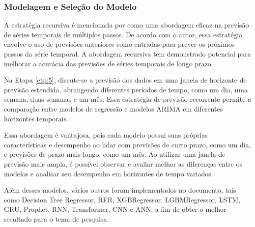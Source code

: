\subsubsection{Modelagem e Sele\c c\~ao do Modelo}\label{subsubsec:est}

A estratégia recursiva é mencionada por  como uma abordagem eficaz na previsão de séries temporais de múltiplos passos. De acordo com o autor, essa estratégia envolve o uso de previsões anteriores como entradas para prever os próximos passos da série temporal. A abordagem recursiva tem demonstrado potencial para melhorar a acurácia das previsões de séries temporais de longo prazo.

Na Etapa \ref{etp:5}, discute-se a previsão dos dados em uma janela de horizonte de previsão estendida, abrangendo diferentes períodos de tempo, como um dia, uma semana, duas semanas e um mês. Essa estratégia de previsão recorrente permite a comparação entre modelos de regressão e modelos ARIMA em diferentes horizontes temporais.

Essa abordagem é vantajosa, pois cada modelo possui suas próprias características e desempenho ao lidar com previsões de curto prazo, como um dia, e previsões de prazo mais longo, como um mês. Ao utilizar uma janela de previsão mais ampla, é possível observar e avaliar melhor as diferenças entre os modelos e analisar seu desempenho em horizontes de tempo variados.

Além desses modelos, vários outros foram implementados no documento, tais como Decision Tree Regressor, RFR, XGBRegressor, LGBMRegressor, LSTM, GRU, Prophet, RNN, Transformer, CNN e ANN, a fim de obter o melhor resultado para o tema de pesquisa.